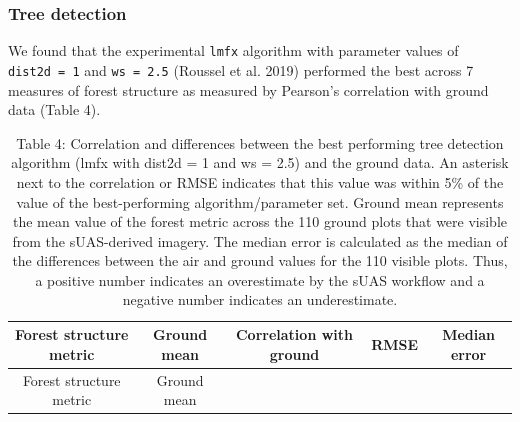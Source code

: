 \documentclass[]{article}
\begin{document}
\subsubsection{Tree detection}\label{tree-detection-1}

We found that the experimental \texttt{lmfx} algorithm with parameter
values of \texttt{dist2d\ =\ 1} and \texttt{ws\ =\ 2.5} (Roussel et al.
2019) performed the best across 7 measures of forest structure as
measured by Pearson's correlation with ground data (Table 4).

\begin{longtable}[]{@{}ccccc@{}}
\caption{Table 4: Correlation and differences between the best
performing tree detection algorithm (lmfx with dist2d = 1 and ws = 2.5)
and the ground data. An asterisk next to the correlation or RMSE
indicates that this value was within 5\% of the value of the
best-performing algorithm/parameter set. Ground mean represents the mean
value of the forest metric across the 110 ground plots that were visible
from the sUAS-derived imagery. The median error is calculated as the
median of the differences between the air and ground values for the 110
visible plots. Thus, a positive number indicates an overestimate by the
sUAS workflow and a negative number indicates an
underestimate.}\tabularnewline
\toprule
\begin{minipage}[b]{0.28\columnwidth}\centering\strut
Forest structure metric\strut
\end{minipage} & \begin{minipage}[b]{0.13\columnwidth}\centering\strut
Ground mean\strut
\end{minipage} & \begin{minipage}[b]{0.24\columnwidth}\centering\strut
Correlation with ground\strut
\end{minipage} & \begin{minipage}[b]{0.08\columnwidth}\centering\strut
RMSE\strut
\end{minipage} & \begin{minipage}[b]{0.13\columnwidth}\centering\strut
Median error\strut
\end{minipage}\tabularnewline
\midrule
\endfirsthead
\toprule
\begin{minipage}[b]{0.28\columnwidth}\centering\strut
Forest structure metric\strut
\end{minipage} & \begin{minipage}[b]{0.13\columnwidth}\centering\strut
Ground mean\strut
\end{minipage} & \begin{minipage}[b]{0.24\columnwidth}\centering\strut

\end{minipage}
\end{longtable}
\end{document}
